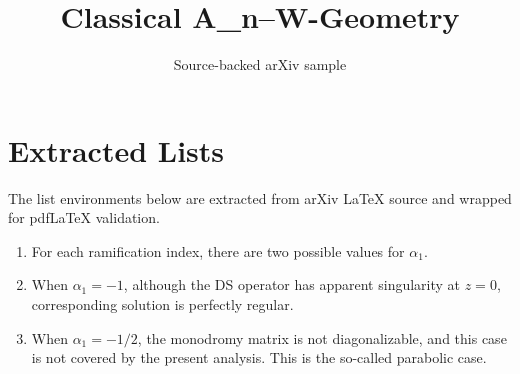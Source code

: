 \documentclass[11pt]{article}
\title{Classical A\_n--W-Geometry}
\author{Source-backed arXiv sample}
\date{}
\begin{document}
\maketitle
\section{Extracted Lists}

The list environments below are extracted from arXiv LaTeX source and wrapped for pdfLaTeX validation.

\begin{enumerate}
\item For each ramification index, there are two possible values for
      $\alpha_1$.
\item When $\alpha_1 = -1$, although the DS operator has apparent
      singularity at $z=0$, corresponding solution is perfectly regular.
\item When $\alpha_1=-1/2$,  the monodromy matrix is not diagonalizable,
      and this case is not covered by the present analysis. This is
      the so-called parabolic case.
\end{enumerate}
\end{document}
